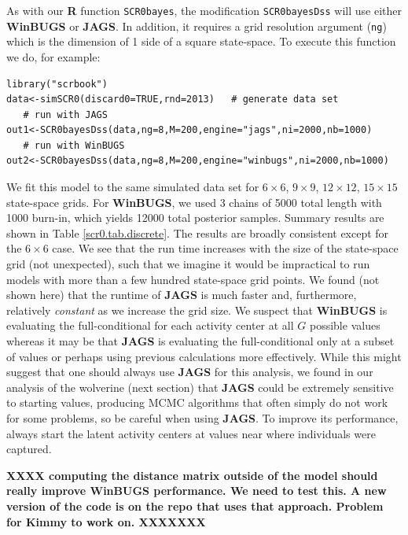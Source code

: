 {{As with our {\bf R} function \mbox{\tt SCR0bayes}, the modification
\mbox{\tt SCR0bayesDss} will use either {\bf WinBUGS} or {\bf
  JAGS}. In addition, it requires a grid resolution argument
(\mbox{\tt ng}) which is the dimension of 1 side of a square state-space.
To execute this function we do, for example:
{\small
\begin{verbatim}
library("scrbook")
data<-simSCR0(discard0=TRUE,rnd=2013)   # generate data set
   # run with JAGS
out1<-SCR0bayesDss(data,ng=8,M=200,engine="jags",ni=2000,nb=1000) 
   # run with WinBUGS
out2<-SCR0bayesDss(data,ng=8,M=200,engine="winbugs",ni=2000,nb=1000) 
\end{verbatim}
} 
We fit this model to the same simulated data set for $6 \times 6$,
$9 \times 9$, $12 \times 12$, $15\times 15$ state-space grids.  For
{\bf WinBUGS}, we used 3 chains of 5000 total length with 1000
burn-in, which yields 12000 total posterior samples.  Summary results
are shown in Table \ref{scr0.tab.discrete}.  The results are broadly
consistent except for the $6\times 6$ case.  We see that the run time
increases with the size of the state-space grid (not unexpected), such
that we imagine it would be impractical to run models with more than a
few hundred state-space grid points.  We found (not shown here) that
the runtime of {\bf JAGS} is much faster and, furthermore, relatively
{\it constant} as we increase the grid size.  We suspect that {\bf
  WinBUGS} is evaluating the full-conditional for each activity center
at all $G$ possible values whereas it may be that {\bf JAGS} is
evaluating the full-conditional only at a subset of values or perhaps
using previous calculations more effectively.  While this might
suggest that one should always use {\bf JAGS} for this analysis, we
found in our analysis of the wolverine (next section) that {\bf JAGS}
could be extremely sensitive to starting values, producing MCMC
algorithms that often simply do not work for some problems, so be
careful when using {\bf JAGS}. To improve its performance, always
start the latent activity centers at values near where individuals
were captured. 


{\bf XXXX computing the distance matrix outside of the model should
  really improve WinBUGS performance. We need to test this. A new
  version of the code is on the repo that uses that approach. Problem
  for Kimmy to work on.
 XXXXXXX}

}}
